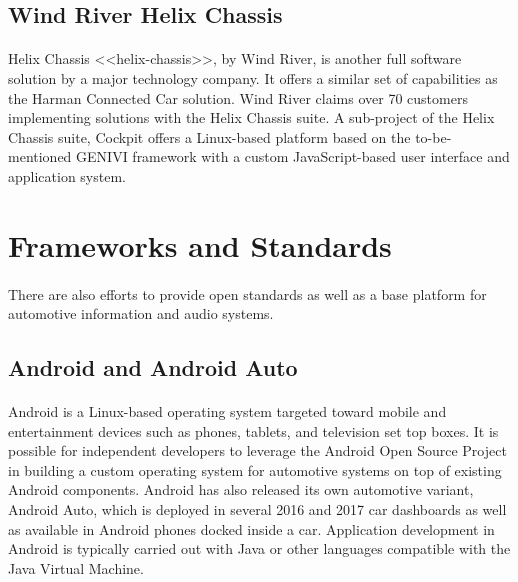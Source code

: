 \subsection{Wind River Helix Chassis}

\paragraph{}
Helix Chassis <<helix-chassis>>, by Wind River, is another full software solution by a major technology company.
It offers a similar set of capabilities as the Harman Connected Car solution.
Wind River claims over 70 customers implementing solutions with the Helix Chassis suite.
A sub-project of the Helix Chassis suite, Cockpit offers a Linux-based platform based on the to-be-mentioned GENIVI framework with a custom JavaScript-based user interface and application system.

\section{Frameworks and Standards}

\paragraph{}
There are also efforts to provide open standards as well as a base platform for automotive information and audio systems.

\subsection{Android and Android Auto}

\paragraph{}
Android is a Linux-based operating system targeted toward mobile and entertainment devices such as phones, tablets, and television set top boxes.
It is possible for independent developers to leverage the Android Open Source Project in building a custom operating system for automotive systems on top of existing Android components.
Android has also released its own automotive variant, Android Auto, which is deployed in several 2016 and 2017 car dashboards as well as available in Android phones docked inside a car.
Application development in Android is typically carried out with Java or other languages compatible with the Java Virtual Machine.

